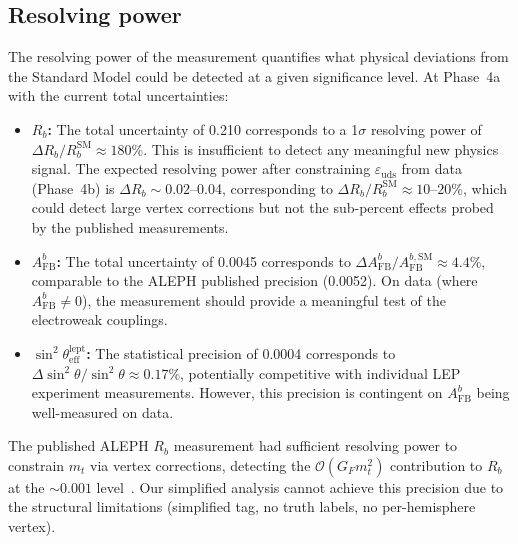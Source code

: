 \documentclass[11pt,a4paper]{article}
\begin{document}
\subsection{Resolving power}
\label{sec:resolving_power}

The resolving power of the measurement quantifies what physical deviations from the
Standard Model could be detected at a given significance level. At Phase~4a with the
current total uncertainties:

\begin{itemize}
\item \textbf{$R_b$:} The total uncertainty of 0.210 corresponds to a 1$\sigma$ resolving
power of $\Delta R_b / R_b^\mathrm{SM} \approx 180\%$. This is insufficient to detect
any meaningful new physics signal. The expected resolving power after constraining
$\varepsilon_\mathrm{uds}$ from data (Phase~4b) is $\Delta R_b \sim 0.02$--0.04,
corresponding to $\Delta R_b / R_b^\mathrm{SM} \approx 10$--$20\%$, which could detect
large vertex corrections but not the sub-percent effects probed by the published
measurements.

\item \textbf{$A_\mathrm{FB}^b$:} The total uncertainty of 0.0045 corresponds to
$\Delta A_\mathrm{FB}^b / A_\mathrm{FB}^{b,\mathrm{SM}} \approx 4.4\%$, comparable
to the ALEPH published precision (0.0052). On data (where $A_\mathrm{FB}^b \neq 0$),
the measurement should provide a meaningful test of the electroweak couplings.

\item \textbf{$\sin^2\theta_\mathrm{eff}^\mathrm{lept}$:} The statistical precision
of 0.0004 corresponds to $\Delta \sin^2\theta / \sin^2\theta \approx 0.17\%$,
potentially competitive with individual LEP experiment measurements. However, this
precision is contingent on $A_\mathrm{FB}^b$ being well-measured on data.
\end{itemize}

The published ALEPH $R_b$ measurement had sufficient resolving power to constrain
$m_t$ via vertex corrections, detecting the $\mathcal{O}(G_F m_t^2)$ contribution
to $R_b$ at the $\sim 0.001$ level~\cite{ALEPH:Rb:1996}. Our simplified analysis
cannot achieve this precision due to the structural limitations (simplified tag,
no truth labels, no per-hemisphere vertex).

\FloatBarrier
{}
\end{document}
